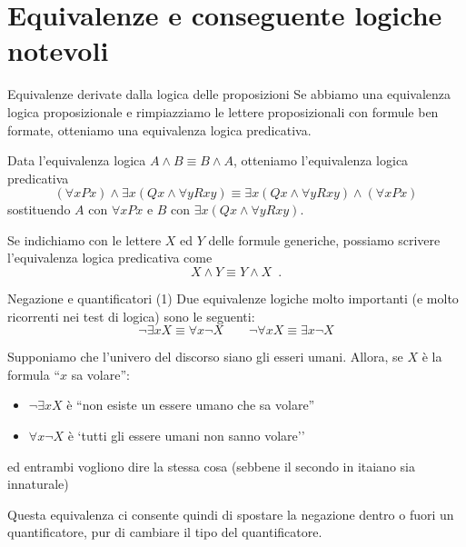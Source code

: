 \documentclass[aspectratio=169,10pt,dvipsnames,xcolor=table,handout]{beamer}
\begin{document}

\section{Equivalenze e conseguente logiche notevoli}

\begin{frame}{Equivalenze derivate dalla logica delle proposizioni}
    Se abbiamo una equivalenza logica proposizionale e rimpiazziamo le lettere proposizionali con formule ben formate, otteniamo una equivalenza logica predicativa.

    \begin{example}
        Data l'equivalenza logica $A \wedge B \equiv B \wedge A$, otteniamo l'equivalenza logica predicativa
        \[
            (\forall x Px) \wedge \exists x(Qx \wedge \forall y Rxy) \equiv \exists x(Qx \wedge \forall y Rxy) \wedge (\forall x Px)
        \]
        sostituendo $A$ con $\forall x Px$ e $B$ con $\exists x(Qx \wedge \forall y Rxy)$.
    \end{example}

    Se indichiamo con le lettere $X$ ed $Y$ delle formule generiche, possiamo scrivere l'equivalenza logica predicativa come
    \[
        X \wedge Y \equiv Y \wedge X \enspace.
    \]
\end{frame}

\begin{frame}{Negazione e quantificatori (1)}
    Due equivalenze logiche molto importanti (e molto ricorrenti nei test di logica) sono le seguenti:
    \[
        \neg \exists x X \equiv \forall x \neg X \qquad \neg \forall x X \equiv \exists x \neg X
    \]
    \begin{example}
        Supponiamo che l'univero del discorso siano gli esseri umani. Allora, se $X$ è la formula ``$x$ sa volare'':
        \begin{itemize}
            \item $\neg \exists x X$ è ``non esiste un essere umano che sa volare''
            \item $\forall x \neg X$ è `tutti gli essere umani non sanno volare''
        \end{itemize}
        ed entrambi vogliono dire la stessa cosa (sebbene il secondo in itaiano sia innaturale)
    \end{example}
    Questa equivalenza  ci consente quindi di spostare la negazione dentro o fuori un quantificatore, pur di cambiare il tipo del quantificatore.
\end{frame}
\end{document}
